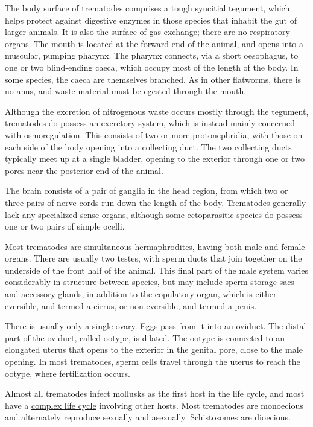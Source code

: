 The body surface of trematodes comprises a tough syncitial tegument,
which helps protect against digestive enzymes in those species that
inhabit the gut of larger animals. It is also the surface of gas
exchange; there are no respiratory organs. The mouth is located at the
forward end of the animal, and opens into a muscular, pumping pharynx.
The pharynx connects, via a short oesophagus, to one or two blind-ending
caeca, which occupy most of the length of the body. In some species, the
caeca are themselves branched. As in other flatworms, there is no anus,
and waste material must be egested through the mouth.

Although the excretion of nitrogenous waste occurs mostly through the
tegument, trematodes do possess an excretory system, which is instead
mainly concerned with osmoregulation. This consists of two or more
protonephridia, with those on each side of the body opening into a
collecting duct. The two collecting ducts typically meet up at a single
bladder, opening to the exterior through one or two pores near the
posterior end of the animal.

The brain consists of a pair of ganglia in the head region, from which
two or three pairs of nerve cords run down the length of the body.
Trematodes generally lack any specialized sense organs, although some
ectoparasitic species do possess one or two pairs of simple ocelli.

Most trematodes are simultaneous hermaphrodites, having both male and
female organs. There are usually two testes, with sperm ducts that join
together on the underside of the front half of the animal. This final
part of the male system varies considerably in structure between
species, but may include sperm storage sacs and accessory glands, in
addition to the copulatory organ, which is either eversible, and termed
a cirrus, or non-eversible, and termed a penis.

There is usually only a single ovary. Eggs pass from it into an oviduct.
The distal part of the oviduct, called ootype, is dilated. The ootype is
connected to an elongated uterus that opens to the exterior in the
genital pore, close to the male opening. In most trematodes, sperm cells
travel through the uterus to reach the ootype, where fertilization
occurs.

Almost all trematodes infect mollusks as the first host in the life
cycle, and most have a
\href{https://en.wikipedia.org/wiki/Trematode_life_cycle_stages}{complex
life cycle} involving other hosts. Most trematodes are monoecious and
alternately reproduce sexually and asexually. Schistosomes are
dioecious.

